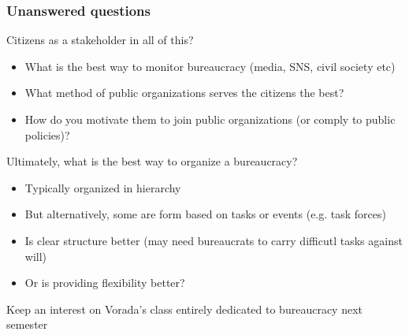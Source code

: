 \documentclass[aspectratio=169]{beamer}
\begin{document}
\begin{frame}
\frametitle{Unanswered questions}
Citizens as a stakeholder in all of this?
\begin{itemize}\setlength\itemsep{3pt}
\item What is the best way to monitor bureaucracy (media, SNS, civil society etc)
\item What method of public organizations serves the citizens the best?
\item How do you motivate them to join public organizations (or comply to public policies)?
\end{itemize}\medskip
Ultimately, what is the best way to organize a bureaucracy?
\begin{itemize}\setlength\itemsep{3pt}
\item Typically organized in hierarchy
\item But alternatively, some are form based on tasks or events (e.g. task forces)
\item Is clear structure better (may need bureaucrats to carry difficutl tasks against will)
\item Or is providing flexibility better?
\end{itemize}\medskip
Keep an interest on Vorada's class entirely dedicated to bureaucracy next semester
\end{frame}



\end{document}
